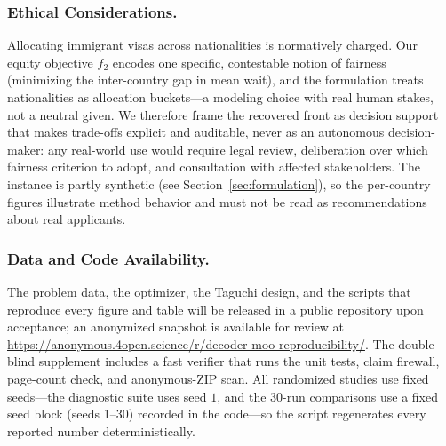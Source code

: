 \documentclass[runningheads]{llncs}
\begin{document}
\subsubsection*{Ethical Considerations.}
Allocating immigrant visas across nationalities is normatively charged. Our equity objective $f_2$ encodes one specific, contestable notion of fairness (minimizing the inter-country gap in mean wait), and the formulation treats nationalities as allocation buckets---a modeling choice with real human stakes, not a neutral given. We therefore frame the recovered front as decision support that makes trade-offs explicit and auditable, never as an autonomous decision-maker: any real-world use would require legal review, deliberation over which fairness criterion to adopt, and consultation with affected stakeholders. The instance is partly synthetic (see Section~\ref{sec:formulation}), so the per-country figures illustrate method behavior and must not be read as recommendations about real applicants.

\subsubsection*{Data and Code Availability.}
The problem data, the optimizer, the Taguchi design, and the scripts that reproduce every figure and table will be released in a public repository upon acceptance; an anonymized snapshot is available for review at \url{https://anonymous.4open.science/r/decoder-moo-reproducibility/}. The double-blind supplement includes a fast verifier that runs the unit tests, claim firewall, page-count check, and anonymous-ZIP scan. All randomized studies use fixed seeds---the diagnostic suite uses seed $1$, and the 30-run comparisons use a fixed seed block (seeds 1--30) recorded in the code---so the script regenerates every reported number deterministically.
\end{document}

